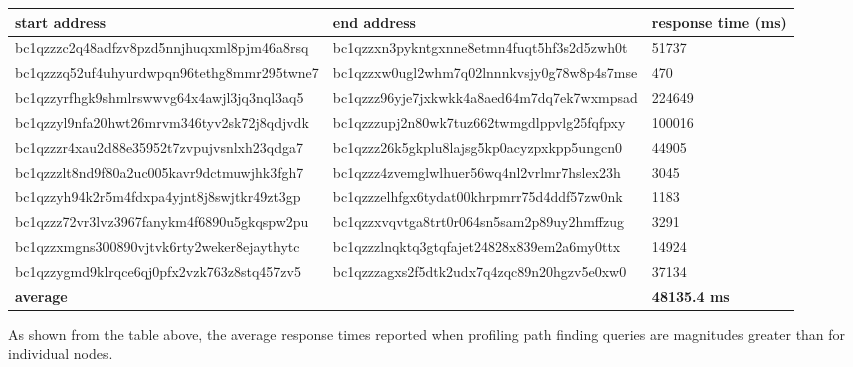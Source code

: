 \begin{center}
\begin{tabular}{ |p{5.5cm}|p{5.5cm}| p{3cm} |} 
 \hline
\textbf{start address} & \textbf{end address} & \textbf{response} \textbf{time (ms)} \\\hline
bc1qzzzc2q48adfzv8p\-zd5nnjhuqxml8pjm46a8rsq & bc1qzzxn3pykntgxnne\-8etmn4fuqt5hf3s2d5zwh0t & 51737 \\\hline
bc1qzzzq52uf4uhyurd\-wpqn96tethg8mmr295twne7 & bc1qzzxw0ugl2whm7q0\-2lnnnkvsjy0g78w8p4s7mse & 470 \\\hline
bc1qzzyrfhgk9shmlrs\-wwvg64x4awjl3jq3nql3aq5 & bc1qzzz96yje7jxkwkk\-4a8aed64m7dq7ek7wxmpsad & 224649 \\\hline
bc1qzzyl9nfa20hwt26\-mrvm346tyv2sk72j8qdjvdk & bc1qzzzupj2n80wk7tu\-z662twmgdlppvlg25fqfpxy & 100016 \\\hline
bc1qzzzr4xau2d88e35\-952t7zvpujvsnlxh23qdga7 & bc1qzzz26k5gkplu8la\-jsg5kp0acyzpxkpp5ungcn0 & 44905 \\\hline
bc1qzzzlt8nd9f80a2u\-c005kavr9dctmuwjhk3fgh7 & bc1qzzz4zvemglwlhue\-r56wq4nl2vrlmr7hslex23h & 3045 \\\hline
bc1qzzyh94k2r5m4fdx\-pa4yjnt8j8swjtkr49zt3gp & bc1qzzzelhfgx6tydat\-00khrpmrr75d4ddf57zw0nk & 1183 \\\hline
bc1qzzz72vr3lvz3967\-fanykm4f6890u5gkqspw2pu & bc1qzzxvqvtga8trt0r\-064sn5sam2p89uy2hmffzug & 3291 \\\hline
bc1qzzxmgns300890vj\-tvk6rty2weker8ejaythytc & bc1qzzzlnqktq3gtqfa\-jet24828x839em2a6my0ttx & 14924 \\\hline
bc1qzzygmd9klrqce6q\-j0pfx2vzk763z8stq457zv5 & bc1qzzzagxs2f5dtk2u\-dx7q4zqc89n20hgzv5e0xw0 & 37134 \\
\hline \textbf{average} & & \textbf{48135.4 ms} \\\hline
\end{tabular}
\end{center}
As shown from the table above, the average response times reported when profiling path finding queries are magnitudes greater than for individual nodes. 

